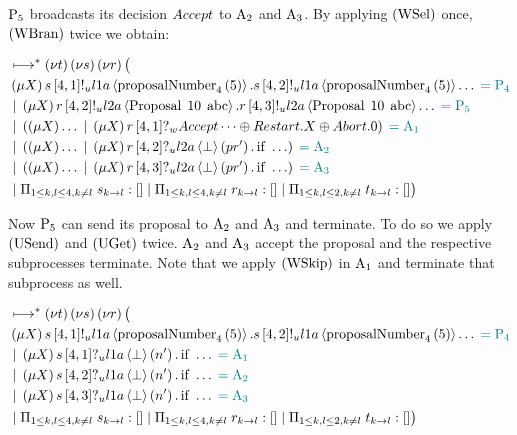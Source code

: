 $\Proposer{5}$ broadcasts its decision $\Accept$ to $\Acceptor{2}$ and $\Acceptor{3}$.
By applying $\RWsel$ once, $\RWbran$ twice we obtain:

\begin{align*}
&\mapstostar \NuChannels \big (\\
&\Mu{X} \SendUnreliableP{s}{4}{1}{\LOneA}{\proposalNumber{5}{4}}.\SendUnreliableP{s}{4}{2}{\LOneA}{\proposalNumber{5}{4}}\dots \comment{= \Proposer{4}}\\
&\Or \Mu{X} \SendUnreliableP{r}{4}{2}{\LTwoA}{\ProposalC{10}{\ABC}}.\SendUnreliableP{r}{4}{3}{\LTwoA}{\ProposalC{10}{\ABC}}\dots \comment{= \Proposer{5}}\\
&\Or \Paren{
    \Mu{X} \dots
    \Or \Mu{X} \ReceiveWeaklyP{r}{4}{1}{\BeginPaCont}
} \comment{= \Acceptor{1}}\\
&\Or \Paren{
    \Mu{X} \dots
    \Or \Mu{X} \ReceiveUnreliableP{r}{4}{2}{\LTwoA}{\bot}{pr'}.\If{\dots}
} \comment{= \Acceptor{2}}\\
&\Or \Paren{
    \Mu{X} \dots
    \Or \Mu{X} \ReceiveUnreliableP{r}{4}{3}{\LTwoA}{\bot}{pr'}.\If{\dots}
} \comment{= \Acceptor{3}}\\
&\Or \InnerSessionQueues{s}
\Or \InnerSessionQueues{r}
\Or \OuterSessionQueues
\big )
\end{align*}

Now $\Proposer{5}$ can send its proposal to $\Acceptor{2}$ and $\Acceptor{3}$ and terminate.
To do so we apply $\RUsend$ and $\RUget$ twice.
$\Acceptor{2}$ and $\Acceptor{3}$ accept the proposal and the respective subprocesses terminate.
Note that we apply $\RWskip$ in $\Acceptor{1}$ and terminate that subprocess as well.

\begin{align*}
&\mapstostar \NuChannels \big (\\
&\Mu{X} \SendUnreliableP{s}{4}{1}{\LOneA}{\proposalNumber{5}{4}}.\SendUnreliableP{s}{4}{2}{\LOneA}{\proposalNumber{5}{4}}\dots \comment{= \Proposer{4}}\\
&\Or \Mu{X} \ReceiveUnreliableP{s}{4}{1}{\LOneA}{\bot}{n'}.\If{\dots} \comment{= \Acceptor{1}}\\
&\Or \Mu{X} \ReceiveUnreliableP{s}{4}{2}{\LOneA}{\bot}{n'}.\If{\dots} \comment{= \Acceptor{2}}\\
&\Or \Mu{X} \ReceiveUnreliableP{s}{4}{3}{\LOneA}{\bot}{n'}.\If{\dots} \comment{= \Acceptor{3}}\\
&\Or \InnerSessionQueues{s}
\Or \InnerSessionQueues{r}
\Or \OuterSessionQueues
\big )
\end{align*}

